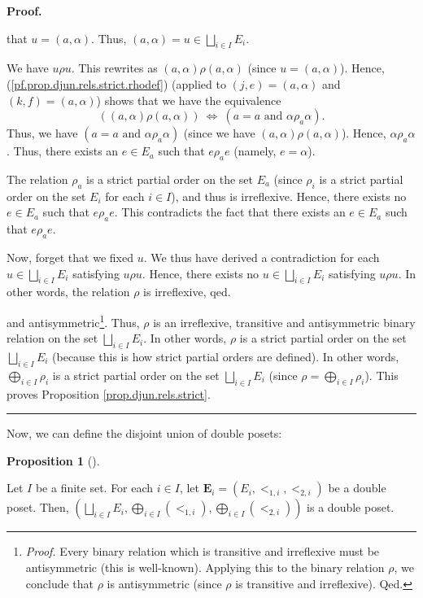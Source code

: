 \documentclass[numbers=enddot,12pt,final,onecolumn,notitlepage,abstracton]{scrartcl}
\theoremstyle{definition}
\newtheorem{prop}[theo]{Proposition}
\newenvironment{proposition}[1][]
{\begin{prop}[#1]\begin{leftbar}}
{\end{leftbar}\end{prop}}
\newenvironment{proof}[1][Proof]{\noindent\textbf{#1.} }{\ \rule{0.5em}{0.5em}}
\newenvironment{verlong}{}{}
\begin{document}
\begin{verlong}
\begin{footnotesize}
\begin{proof}
{that $u=\left(  a,\alpha\right)  $. Thus, $\left(  a,\alpha\right)
=u\in\bigsqcup_{i\in I}E_{i}$.
\par
We have $u\rho u$. This rewrites as $\left(  a,\alpha\right)  \rho\left(
a,\alpha\right)  $ (since $u=\left(  a,\alpha\right)  $). Hence,
(\ref{pf.prop.djun.rels.strict.rhodef}) (applied to $\left(  j,e\right)
=\left(  a,\alpha\right)  $ and $\left(  k,f\right)  =\left(  a,\alpha\right)
$) shows that we have the equivalence%
\[
\left(  \left(  a,\alpha\right)  \rho\left(  a,\alpha\right)  \right)
\ \Longleftrightarrow\ \left(  a=a\text{ and }\alpha\rho_{a}\alpha\right)  .
\]
Thus, we have $\left(  a=a\text{ and }\alpha\rho_{a}\alpha\right)  $ (since we
have $\left(  a,\alpha\right)  \rho\left(  a,\alpha\right)  $). Hence,
$\alpha\rho_{a}\alpha$. Thus, there exists an $e\in E_{a}$ such that
$e\rho_{a}e$ (namely, $e=\alpha$).
\par
The relation $\rho_{a}$ is a strict partial order on the set $E_{a}$ (since
$\rho_{i}$ is a strict partial order on the set $E_{i}$ for each $i\in I$),
and thus is irreflexive. Hence, there exists no $e\in E_{a}$ such that
$e\rho_{a}e$. This contradicts the fact that there exists an $e\in E_{a}$ such
that $e\rho_{a}e$.
\par
Now, forget that we fixed $u$. We thus have derived a contradiction for each
$u\in\bigsqcup_{i\in I}E_{i}$ satisfying $u\rho u$. Hence, there exists no
$u\in\bigsqcup_{i\in I}E_{i}$ satisfying $u\rho u$. In other words, the
relation $\rho$ is irreflexive, qed.} and
antisymmetric\footnote{\textit{Proof.} Every binary relation which is
transitive and irreflexive must be antisymmetric (this is well-known).
Applying this to the binary relation $\rho$, we conclude that $\rho$ is
antisymmetric (since $\rho$ is transitive and irreflexive). Qed.}. Thus,
$\rho$ is an irreflexive, transitive and antisymmetric binary relation on the
set $\bigsqcup_{i\in I}E_{i}$. In other words, $\rho$ is a strict partial
order on the set $\bigsqcup_{i\in I}E_{i}$ (because this is how strict partial
orders are defined). In other words, $\bigoplus_{i\in I}\rho_{i}$ is a strict
partial order on the set $\bigsqcup_{i\in I}E_{i}$ (since $\rho=\bigoplus
_{i\in I}\rho_{i}$). This proves Proposition \ref{prop.djun.rels.strict}.
\end{proof}

Now, we can define the disjoint union of double posets:

\begin{proposition}
\label{prop.djun.doubs}Let $I$ be a finite set. For each $i\in I$, let
$\mathbf{E}_{i}=\left(  E_{i},<_{1,i},<_{2,i}\right)  $ be a double poset.
Then, $\left(  \bigsqcup_{i\in I}E_{i},\bigoplus_{i\in I}\left(
<_{1,i}\right)  ,\bigoplus_{i\in I}\left(  <_{2,i}\right)  \right)  $ is a
double poset.
\end{proposition}


\end{footnotesize}
\end{verlong}
\end{document}
